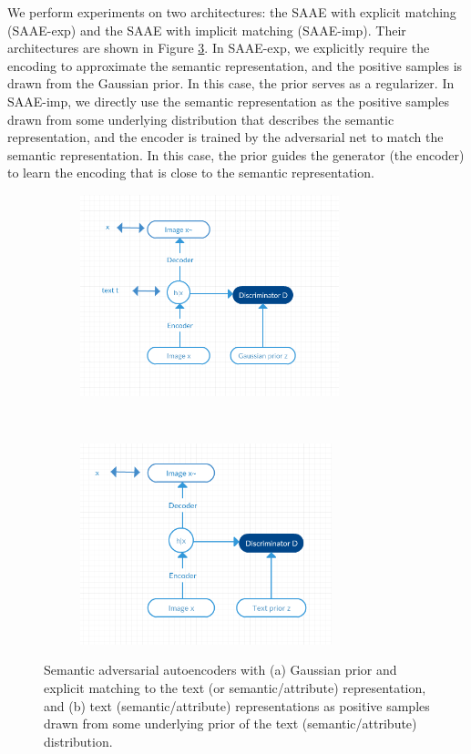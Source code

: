 \documentclass{article}
\begin{document}
	We perform experiments on two architectures: the SAAE with explicit matching (SAAE-exp) and the SAAE with implicit matching (SAAE-imp). Their architectures are shown in Figure \ref{fig:Architecture}. In SAAE-exp, we explicitly require the encoding to approximate the semantic representation, and the positive samples is drawn from the Gaussian prior. In this case, the prior serves as a regularizer. In SAAE-imp, we directly use the semantic representation as the positive samples drawn from some underlying distribution that describes the semantic representation, and the encoder is trained by the adversarial net to match the semantic representation. In this case, the prior guides the generator (the encoder) to learn the encoding that is close to the semantic representation.



\begin{figure}[hbt!]
    \centering
    \begin{subfigure}[t]{0.5\textwidth}
        \centering
        \includegraphics[height=2.30in]{fig1}
        \caption{}
            \label{fig:Architecturea}
    \end{subfigure}%
    ~ 
    \begin{subfigure}[t]{0.5\textwidth}
        \centering
        \includegraphics[height=2.30in]{fig2}
        \caption{}
                    \label{fig:Architectureb}
    \end{subfigure}
    \caption{Semantic adversarial autoencoders with (a) Gaussian prior and explicit matching to the text (or semantic/attribute) representation, and (b) text (semantic/attribute) representations as positive samples drawn from some underlying prior of the text (semantic/attribute) distribution.}
    \label{fig:Architecture}
\end{figure}
\end{document}
